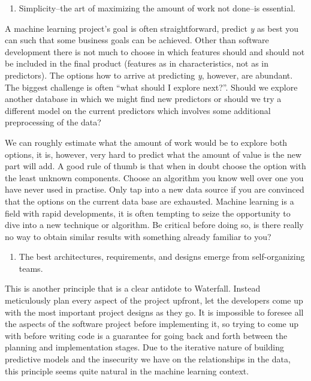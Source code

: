 \documentclass[]{book}
\providecommand{\tightlist}{%
  \setlength{\itemsep}{0pt}\setlength{\parskip}{0pt}}
\begin{document}
\begin{enumerate}
\def\labelenumi{\arabic{enumi})}
\setcounter{enumi}{9}
\tightlist
\item
  Simplicity--the art of maximizing the amount of work not done--is essential.
\end{enumerate}

A machine learning project's goal is often straightforward, predict \emph{y} as best you can such that some business goals can be achieved. Other than software development there is not much to choose in which features should and should not be included in the final product (features as in characteristics, not as in predictors). The options how to arrive at predicting \emph{y}, however, are abundant. The biggest challenge is often ``what should I explore next?''. Should we explore another database in which we might find new predictors or should we try a different model on the current predictors which involves some additional preprocessing of the data?

We can roughly estimate what the amount of work would be to explore both options, it is, however, very hard to predict what the amount of value is the new part will add. A good rule of thumb is that when in doubt choose the option with the least unknown components. Choose an algorithm you know well over one you have never used in practise. Only tap into a new data source if you are convinced that the options on the current data base are exhausted. Machine learning is a field with rapid developments, it is often tempting to seize the opportunity to dive into a new technique or algorithm. Be critical before doing so, is there really no way to obtain similar results with something already familiar to you?

\begin{enumerate}
\def\labelenumi{\arabic{enumi})}
\setcounter{enumi}{10}
\tightlist
\item
  The best architectures, requirements, and designs emerge from self-organizing teams.
\end{enumerate}

This is another principle that is a clear antidote to Waterfall. Instead meticulously plan every aspect of the project upfront, let the developers come up with the most important project designs as they go. It is impossible to foresee all the aspects of the software project before implementing it, so trying to come up with before writing code is a guarantee for going back and forth between the planning and implementation stages. Due to the iterative nature of building predictive models and the insecurity we have on the relationships in the data, this principle seems quite natural in the machine learning context.
\end{document}
